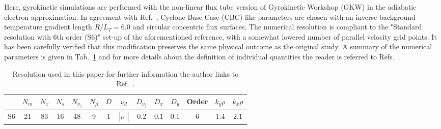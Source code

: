 \documentclass[aip, amsmath, amssymb, reprint, twocolumn]{revtex4-1}
\newcommand{\rlt}{R/L_T}
\begin{document}
Here, gyrokinetic simulations are performed with the non-linear flux tube version of Gyrokinetic Workshop (GKW) \cite{peeters2009} in the adiabatic electron approximation.
In agreement with Ref.~\cite{peeters2016}, Cyclone Base Case (CBC) like parameters are chosen with an inverse background temperature gradient length $\rlt = 6.0$ and circular concentric flux surfaces. 
The numerical resolution is compliant to the "Standard resolution with 6th order (S6)" set-up of the aforementioned reference, with a somewhat lowered number of parallel velocity grid points.
It has been carefully verified that this modification preserves the same physical outcome as the original study.
A summary of the numerical parameters is given in Tab.~\ref{tab:resolution} and for more details about the definition of individual quantities the reader is referred to Refs.~\cite{peeters2009, peeters2016}.
\begin{table}[ht]
	\begin{ruledtabular}
		\begin{tabular}{l | ccccc | ccccc | c | cc}
			& $N_m$ & $N_x$ & $N_s$ & $N_{\nu_\parallel}$ & $N_\mu$ & $D$ & $\nu_d$           & $D_{\nu_\parallel}$ & $D_x$ & $D_y$ & Order & $k_y\rho$ & $k_x\rho$ \\
			\hline
			S6   & 21    & 83    & 16    & 48                  & 9       & 1   & $|\nu_\parallel|$ & 0.2                 & 0.1   & 0.1   & 6     & 1.4       & 2.1       \\
		\end{tabular}
	\end{ruledtabular}
	\caption{
		Resolution used in this paper for further information the author links to Ref.~\cite{peeters2016}. %
	}
	\label{tab:resolution}
\end{table}

\end{document}
